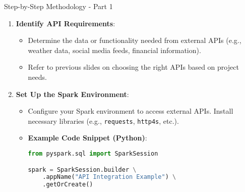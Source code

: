 \documentclass[aspectratio=169]{beamer}
\begin{document}
\begin{frame}{Step-by-Step Methodology - Part 1}
    \begin{enumerate}
        \item \textbf{Identify API Requirements}:
        \begin{itemize}
            \item Determine the data or functionality needed from external APIs (e.g., weather data, social media feeds, financial information).
            \item Refer to previous slides on choosing the right APIs based on project needs.
        \end{itemize}
        
        \item \textbf{Set Up the Spark Environment}:
        \begin{itemize}
            \item Configure your Spark environment to access external APIs. Install necessary libraries (e.g., \texttt{requests}, \texttt{http4s}, etc.).
            \item \textbf{Example Code Snippet (Python)}:
            \begin{lstlisting}[language=Python]
from pyspark.sql import SparkSession

spark = SparkSession.builder \
    .appName("API Integration Example") \
    .getOrCreate()
            \end{lstlisting}
        \end{itemize}
    \end{enumerate}
\end{frame}
\end{document}
